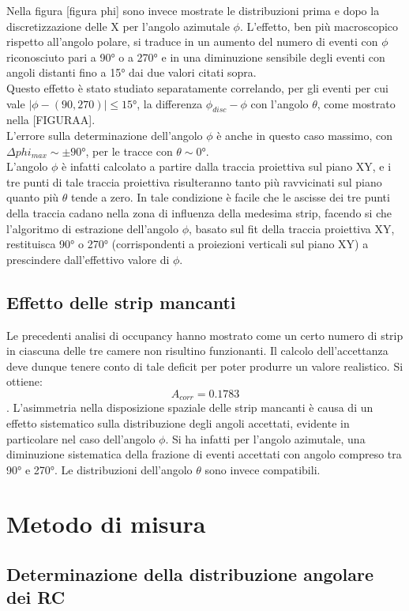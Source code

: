 \documentclass[8pt]{extarticle}
\begin{document}
Nella figura [figura phi] sono invece mostrate le distribuzioni prima e dopo la discretizzazione delle X per l'angolo azimutale $\phi$. L'effetto, ben più macroscopico rispetto all'angolo polare, si traduce in un aumento del numero di eventi con $\phi$ riconosciuto pari a 90° o a 270° e in una diminuzione sensibile degli eventi con angoli distanti fino a 15° dai due valori citati sopra.\\
Questo effetto è stato studiato separatamente correlando, per gli eventi per cui vale $|\phi-(90,270)|\leq 15°$, la differenza $\phi_{disc}-\phi$ con l'angolo $\theta$, come mostrato nella [FIGURAA].\\
L'errore sulla determinazione dell'angolo $\phi$ è anche in questo caso massimo, con $\Delta phi_{max}\sim \pm 90°$, per le tracce con $\theta \sim 0°$. \\
L'angolo $\phi$ è infatti calcolato a partire dalla traccia proiettiva sul piano XY, e i tre punti di tale traccia proiettiva risulteranno tanto più ravvicinati sul piano quanto più $\theta$ tende a zero. In tale condizione è facile che le ascisse dei tre punti della traccia cadano nella zona di influenza della medesima strip, facendo si che l'algoritmo di estrazione dell'angolo $\phi$, basato sul fit della traccia proiettiva XY, restituisca 90° o 270° (corrispondenti a proiezioni verticali sul piano XY) a prescindere dall'effettivo valore di $\phi$.
\subsection{Effetto delle strip mancanti}
Le precedenti analisi di occupancy hanno mostrato come un certo numero di strip in ciascuna delle tre camere non risultino funzionanti. Il calcolo dell'accettanza deve dunque tenere conto di tale deficit per poter produrre un valore realistico. Si ottiene:\[A_{corr}=0.1783\].
L'asimmetria nella disposizione spaziale delle strip mancanti è causa di un effetto sistematico sulla distribuzione degli angoli accettati, evidente in particolare nel caso dell'angolo $\phi$. Si ha infatti per l'angolo azimutale, una diminuzione sistematica della frazione di eventi accettati con angolo compreso tra 90° e 270°. Le distribuzioni dell'angolo $\theta$ sono invece compatibili.

\section{Metodo di misura}

\subsection{Determinazione della distribuzione angolare dei RC}
\end{document}
